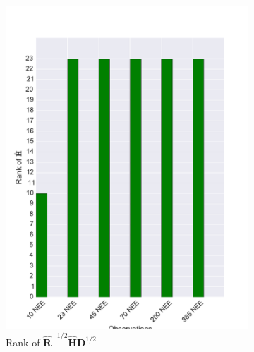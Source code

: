 \documentclass[11pt]{article}
\begin{document}
\begin{figure}[ht]
    \centering
    \begin{subfigure}[b]{0.49\textwidth}
        \includegraphics[width=\textwidth]{dalec2_obsrankcvtwind.pdf}
        \caption{Rank of $\hat{\textbf{R}}^{-1/2}\hat{\textbf{H}}\textbf{D}^{1/2}$}
        \label{fig:D2_observailityrankcvtwind}
    \end{subfigure}
    \begin{subfigure}[b]{0.49\textwidth}

\end{subfigure}
\end{figure}
\end{document}
